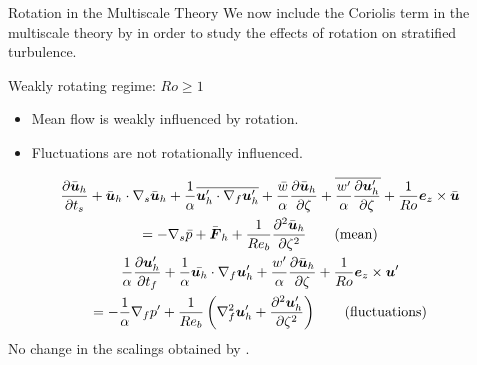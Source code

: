 \documentclass{beamer}
\begin{document}
\begin{frame}{Rotation in the Multiscale Theory}
    We now include the Coriolis term in the multiscale theory by \citet{Chinial2022} in order to study the effects of rotation on stratified turbulence.
\end{frame}

\begin{frame}{Weakly rotating regime: $Ro \ge 1$}

    \begin{itemize}
        \item Mean flow is weakly influenced by rotation.
        \item Fluctuations are not rotationally influenced.
    \end{itemize}
    {\scriptsize
    \begin{gather*}
    \frac{\partial \bar{\boldsymbol{u}}_h}{\partial t_s} + \bar{\boldsymbol{u}}_h\cdot \nabla_s\bar{\boldsymbol{u}}_h
    + \frac{1}{\alpha}\overline{\boldsymbol{u}_h'\cdot\nabla_f\boldsymbol{u}_h'}
    + \frac{\bar{w}}{\alpha}\frac{\partial \bar{\boldsymbol{u}}_h}{\partial \zeta} 
    + \overline{\frac{w'}{\alpha}\frac{\partial \boldsymbol{u}_h'}{\partial \zeta}} + \frac{1}{Ro}\boldsymbol{e}_z \times \bar{\boldsymbol{u}}\\
    = -\nabla_s\bar{p} + \bar{\boldsymbol{F}}_h + \frac{1}{Re_b}\frac{\partial^2 \bar{\boldsymbol{u}}_h}{\partial \zeta^2} \tag{mean}\\
    \frac{1}{\alpha}\frac{\partial \boldsymbol{u}_h'}{\partial t_f} 
    + \frac{1}{\alpha}\bar{\boldsymbol{u}_h}\cdot\nabla_f\boldsymbol{u}_h'
    + \frac{w'}{\alpha}\frac{\partial \bar{\boldsymbol{u}}_h}{\partial \zeta} + \frac{1}{Ro}\boldsymbol{e}_z \times \boldsymbol{u}'\\
    = -\frac{1}{\alpha}\nabla_f p' + \frac{1}{Re_b}\left( \nabla_f^2\boldsymbol{u}_h' + \frac{\partial^2 \boldsymbol{u}_h'}{\partial \zeta^2}\right) \tag{fluctuations}
    \end{gather*}
    }
    No change in the scalings obtained by \citet{Chinial2022}.
\end{frame}
\end{document}
